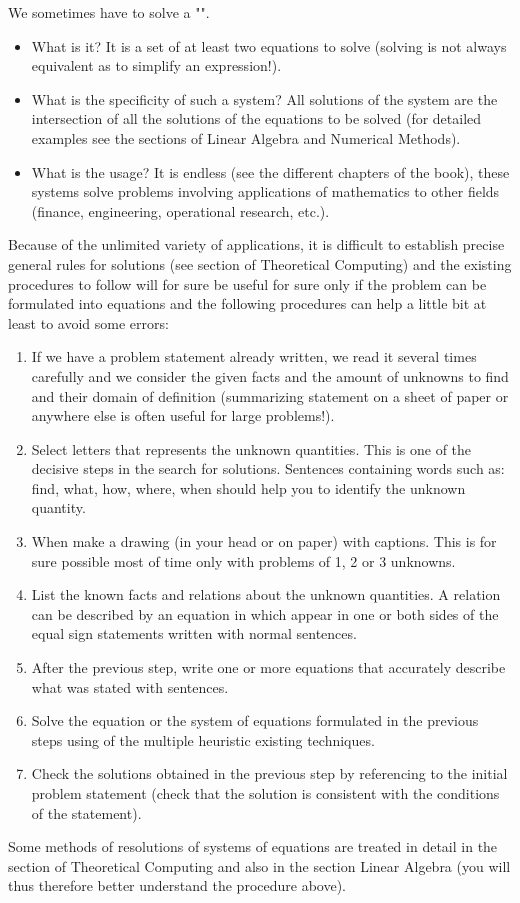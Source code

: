 	We sometimes have to solve a "".
	\begin{itemize}
		\item What is it? It is a set of at least two equations to solve (solving is not always equivalent as to simplify an expression!).

		\item What is the specificity of such a system? All solutions of the system are the intersection of all the solutions of the equations to be solved (for detailed examples see the sections of Linear Algebra and Numerical Methods). 

		\item What is the usage? It is endless (see the different chapters of the book), these systems solve problems involving applications of mathematics to other fields (finance, engineering, operational research, etc.).
	\end{itemize}		
	Because of the unlimited variety of applications, it is difficult to establish precise general rules for solutions (see section of Theoretical Computing) and the existing procedures to follow will for sure be useful for sure only if the problem can be formulated into equations and the following procedures can help a little bit at least to avoid some errors:
	\begin{enumerate}
		\item If we have a problem statement already written, we read it several times carefully and we consider the given facts and the amount of unknowns to find and their domain of definition (summarizing statement on a sheet of paper or anywhere else is often useful for large problems!).
		\item Select letters that represents the unknown quantities. This is one of the decisive steps in the search for solutions. Sentences containing words such as: find, what, how, where, when should help you to identify the unknown quantity.
		\item When make a drawing (in your head or on paper) with captions. This is for sure possible most of time only with problems of 1, 2 or 3 unknowns.
		\item List the known facts and relations about the unknown quantities. A relation can be described by an equation in which appear in one or both sides of the equal sign statements written with normal sentences.
		\item After the previous step, write one or more equations that accurately describe what was stated with sentences.
		
		\item Solve the equation or the system of equations formulated in the previous steps using of the multiple heuristic existing techniques.
		\item Check the solutions obtained in the previous step by referencing to the initial problem statement (check that the solution is consistent with the conditions of the statement).
	\end{enumerate}
	Some methods of resolutions of systems of equations are treated in detail in the section of Theoretical Computing and also in the section Linear Algebra (you will thus therefore better understand the procedure above).
	 
